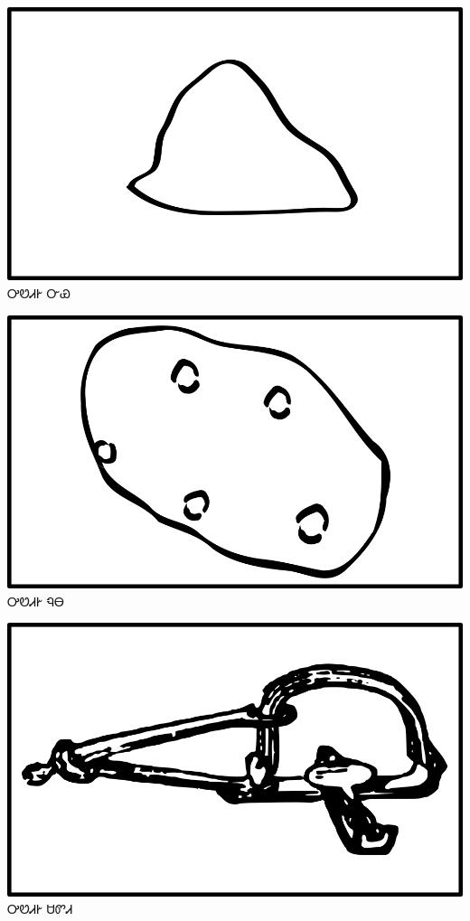 \documentclass[avery5371]{flashcards}%
\begin{document}
    \begin{flashcard}{
        \includegraphics[width=0.95\columnwidth,height=.51\columnwidth,keepaspectratio]{../artwork/objects-neutral/nvya}
    }
        \Huge ᎤᏬᏗᎨ ᏅᏯ
    \end{flashcard}

    \begin{flashcard}{
        \includegraphics[width=0.95\columnwidth,height=.51\columnwidth,keepaspectratio]{../artwork/objects-neutral/nuna}
    }
        \Huge ᎤᏬᏗᎨ ᏄᎾ
    \end{flashcard}

    \begin{flashcard}{
        \includegraphics[width=0.95\columnwidth,height=.51\columnwidth,keepaspectratio]{../artwork/objects-neutral/sadvdi}
    }
        \Huge ᎤᏬᏗᎨ ᏌᏛᏗ
    \end{flashcard}
\end{document}
